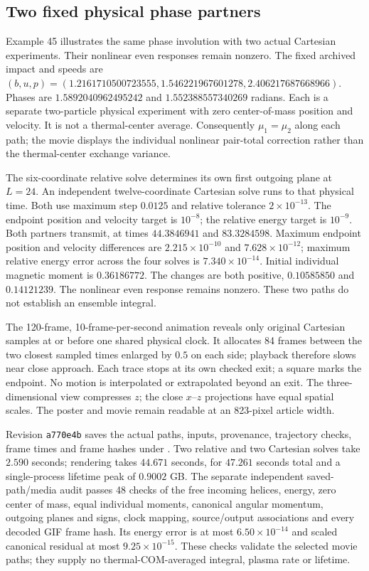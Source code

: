 \documentclass[11pt,letterpaper]{article}
\begin{document}
\subsection*{Two fixed physical phase partners}
Example 45 illustrates the same phase involution with two actual Cartesian
experiments. Their nonlinear even responses remain nonzero.
The fixed archived impact and speeds are
$(b,u,p)=(1.2161710500723555,1.546221967601278,2.406217687668966)$.
Phases are $1.5892040962495242$ and $1.552388557340269$ radians.
Each is a separate two-particle physical experiment with zero center-of-mass
position and velocity. It is not a thermal-center average. Consequently
$\mu_1=\mu_2$ along each path; the movie displays the individual nonlinear
pair-total correction rather than the thermal-center exchange variance.

The six-coordinate relative solve determines its own first outgoing plane
at $L=24$. An independent twelve-coordinate Cartesian solve runs to that
physical time. Both use maximum step $0.0125$ and relative tolerance
$2\times10^{-13}$. The endpoint position and velocity target is $10^{-8}$;
the relative energy target is $10^{-9}$. Both partners transmit, at times
$44.3846941$ and $83.3284598$. Maximum endpoint position and velocity
differences are $2.215\times10^{-10}$ and $7.628\times10^{-12}$;
maximum relative energy error across the four solves is
$7.340\times10^{-14}$. Initial individual magnetic moment is $0.36186772$.
The changes are both positive, $0.10585850$ and $0.14121239$.
The nonlinear even response remains nonzero. These two paths do not
establish an ensemble integral.

The 120-frame, 10-frame-per-second animation reveals only original Cartesian
samples at or before one shared physical clock. It allocates 84 frames
between the two closest sampled times enlarged by $0.5$ on each side;
playback therefore slows near close approach. Each trace stops at its own
checked exit; a square marks the endpoint. No motion is interpolated or
extrapolated beyond an exit. The three-dimensional view compresses $z$;
the close $x$--$z$ projections have equal spatial scales. The poster and
movie remain readable at an 823-pixel article width.

Revision \texttt{a770e4b} saves the actual paths, inputs, provenance,
trajectory checks, frame times and frame hashes under
. Two relative and two Cartesian
solves take $2.590$ seconds; rendering takes $44.671$ seconds, for
$47.261$ seconds total and a single-process lifetime peak of $0.9002$ GB.
The separate independent saved-path/media audit passes 48 checks of the
free incoming helices, energy, zero center of mass, equal individual moments,
canonical angular momentum, outgoing planes and signs, clock mapping,
source/output associations and every decoded GIF frame hash. Its energy
error is at most $6.50\times10^{-14}$ and scaled canonical residual at most
$9.25\times10^{-15}$. These checks validate the selected movie paths;
they supply no thermal-COM-averaged integral, plasma rate or lifetime.
\end{document}
